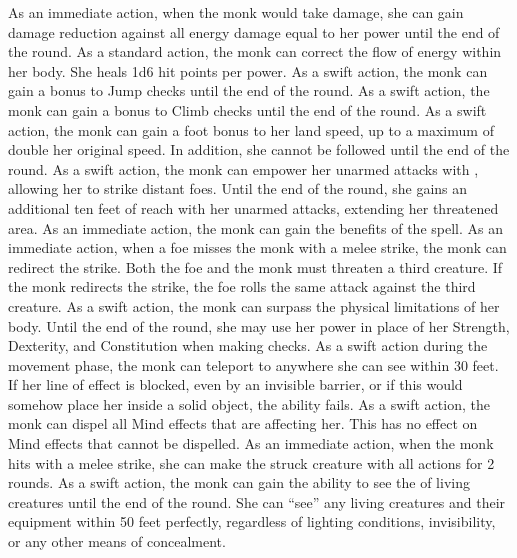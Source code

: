 As an immediate action, when the monk would take  damage, she can gain damage reduction against all energy damage equal to her \ki power until the end of the round.
As a standard action, the monk can correct the flow of energy within her body.
She heals 1d6 hit points per \ki power.
As a swift action, the monk can gain a  bonus to Jump checks until the end of the round.
As a swift action, the monk can gain a  bonus to Climb checks until the end of the round.
As a swift action, the monk can gain a  foot bonus to her land speed, up to a maximum of double her original speed.
In addition, she cannot be followed until the end of the round.
As a swift action, the monk can empower her unarmed attacks with \ki, allowing her to strike distant foes.
Until the end of the round, she gains an additional ten feet of reach with her unarmed attacks, extending her threatened area.
As an immediate action, the monk can gain the benefits of the  spell.
As an immediate action, when a foe misses the monk with a melee strike, the monk can redirect the strike.
Both the foe and the monk must threaten a third creature.
If the monk redirects the strike, the foe rolls the same attack against the third creature.
As a swift action, the monk can surpass the physical limitations of her body.
Until the end of the round, she may use her \ki power in place of her Strength, Dexterity, and Constitution when making checks.
As a swift action during the movement phase, the monk can teleport to anywhere she can see within 30 feet.
If her line of effect is blocked, even by an invisible barrier, or if this would somehow place her inside a solid object, the ability fails.
As a swift action, the monk can dispel all Mind effects that are affecting her.
This has no effect on Mind effects that cannot be dispelled.
As an immediate action, when the monk hits with a melee strike, she can make the struck creature \impaired with all actions for 2 rounds.
As a swift action, the monk can gain the ability to see the \ki of living creatures until the end of the round.
She can ``see'' any living creatures and their equipment within 50 feet perfectly, regardless of lighting conditions, invisibility, or any other means of concealment.
